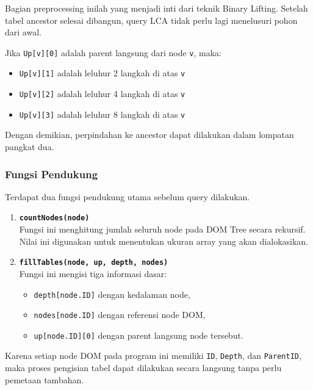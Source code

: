 Bagian preprocessing inilah yang menjadi inti dari teknik Binary Lifting. Setelah tabel
ancestor selesai dibangun, query LCA tidak perlu lagi menelusuri pohon dari awal.

\begin{tcolorbox}[colback=blue!5,title=Intuisi Tabel \texttt{Up}]
Jika \texttt{Up[v][0]} adalah parent langsung dari node \texttt{v}, maka:
\begin{itemize}
    \item \texttt{Up[v][1]} adalah leluhur 2 langkah di atas \texttt{v}
    \item \texttt{Up[v][2]} adalah leluhur 4 langkah di atas \texttt{v}
    \item \texttt{Up[v][3]} adalah leluhur 8 langkah di atas \texttt{v}
\end{itemize}
Dengan demikian, perpindahan ke ancestor dapat dilakukan dalam lompatan pangkat dua.
\end{tcolorbox}

\subsubsection{Fungsi Pendukung}

Terdapat dua fungsi pendukung utama sebelum query dilakukan.

\begin{enumerate}
    \item \textbf{\texttt{countNodes(node)}}\\
    Fungsi ini menghitung jumlah seluruh node pada DOM Tree secara rekursif.
    Nilai ini digunakan untuk menentukan ukuran array yang akan dialokasikan.

    \item \textbf{\texttt{fillTables(node, up, depth, nodes)}}\\
    Fungsi ini mengisi tiga informasi dasar:
    \begin{itemize}
        \item \texttt{depth[node.ID]} dengan kedalaman node,
        \item \texttt{nodes[node.ID]} dengan referensi node DOM,
        \item \texttt{up[node.ID][0]} dengan parent langsung node tersebut.
    \end{itemize}
\end{enumerate}

Karena setiap node DOM pada program ini memiliki \texttt{ID}, \texttt{Depth}, dan
\texttt{ParentID}, maka proses pengisian tabel dapat dilakukan secara langsung tanpa
perlu pemetaan tambahan.

